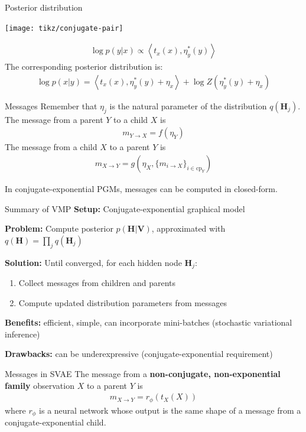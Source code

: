 \documentclass[10pt, compress]{beamer}
\begin{document}
\begin{frame}{Posterior distribution}
   \begin{center}
        \texttt{[image: tikz/conjugate-pair]}
   \end{center}
  \begin{align*}
    \log p(y | x) \propto \left\langle t_x(x), \eta^*_y(y)\right\rangle
  \end{align*}
  \pause
  The corresponding posterior distribution is:
  \begin{align*}
    \log p(x | y) = \left\langle t_x(x), \eta^*_y(y) + \eta_x\right\rangle + \log Z(\eta^*_y(y) + \eta_x)
  \end{align*}
  \pause
  \centering
\end{frame}

\begin{frame}{Messages}
  Remember that $\eta_j$ is the natural parameter of the distribution $q(\mathbf{H}_j)$.
  \pause
  The message from a parent $Y$ to a child $X$ is
  \begin{align*}
    m_{Y \rightarrow X} = f(\eta_Y)
  \end{align*}
  \pause
  The message from a child $X$ to a parent $Y$ is
  \begin{align*}
    m_{X \rightarrow Y} = g(\eta_X, \{m_{i \rightarrow X}\}_{i \in \textrm{cp}_Y})
  \end{align*}

  \pause
  In conjugate-exponential PGMs, messages can be computed in closed-form.
\end{frame}

\begin{frame}{Summary of VMP}
  \textbf{Setup:} Conjugate-exponential graphical model

  \pause
  \textbf{Problem:} Compute posterior $p(\mathbf{H} | \mathbf{V})$, approximated with $q(\mathbf{H}) = \prod_j q(\mathbf{H}_j)$

  \pause
  \textbf{Solution:} Until converged, for each hidden node $\mathbf{H}_j$:
  \begin{enumerate}
    \pause
  \item Collect messages from children and parents
    \pause
  \item Compute updated distribution parameters from messages
\end{enumerate}

\pause
\textbf{Benefits:} efficient, simple, can incorporate mini-batches (stochastic variational inference)

\pause
\textbf{Drawbacks:} can be underexpressive (conjugate-exponential requirement)
\end{frame}

\begin{frame}{Messages in SVAE}
  The message from a \textbf{non-conjugate, non-exponential family} observation $X$ to a parent $Y$ is
  \begin{align*}
    m_{X \rightarrow Y} = r_\phi(t_X(X))
  \end{align*}
  where $r_\phi$ is a neural network whose output
  is the same shape of a message from a conjugate-exponential child.
\end{frame}
\end{document}
